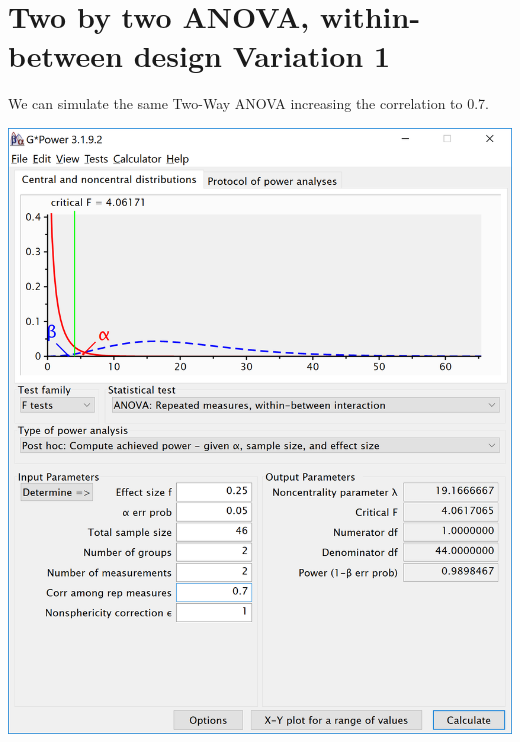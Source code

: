 \documentclass[]{book}
\begin{document}
\hypertarget{two-by-two-anova-within-between-design-variation-1}{%
\section{Two by two ANOVA, within-between design Variation 1}\label{two-by-two-anova-within-between-design-variation-1}}

We can simulate the same Two-Way ANOVA increasing the correlation to 0.7.

\includegraphics{screenshots/gpower_6.png}
\end{document}
